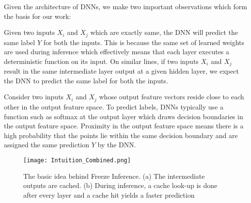 \documentclass[letterpaper,twocolumn,10pt]{article}
\begin{document}
Given the architecture of DNNs, we make two important observations which form the basis for our work:


     Given two inputs $X_{i}$ and $X_{j}$ which are exactly same, the DNN will predict the same label $Y$ for both the inputs. This is because the same set of learned weights are used during inference which effectively means that each layer executes a deterministic function on its input. On similar lines, if two inputs $X_{i}$ and $X_{j}$ result in the same intermediate layer output at a given hidden layer, we expect the DNN to predict the same label for both the inputs.
    
     Consider two inputs $X_{i}$ and $X_{j}$ whose output feature vectors reside close to each other in the output feature space. To predict labels, DNNs typically use a function such as softmax at the output layer which draws decision boundaries in the output feature space. Proximity in the output feature space means there is a high probability that the points lie within the same decision boundary and are assigned the same prediction $Y$ by the DNN.


\begin{figure}[t]
  \centering
   \texttt{[image: Intuition\_Combined.png]}
    \caption{The basic idea behind Freeze Inference. (a) The intermediate outputs are cached. (b) During inference, a cache look-up is done after every layer and a cache hit yields a faster prediction}
    \label{fig:Intuition}
\end{figure}
\end{document}
